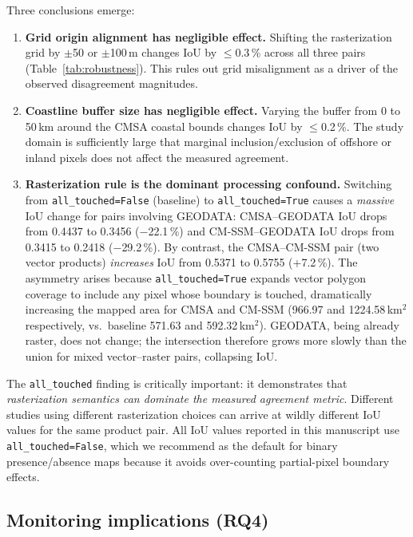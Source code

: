 \documentclass[11pt]{article}
\begin{document}
Three conclusions emerge:

\begin{enumerate}[nosep]
\item \textbf{Grid origin alignment has negligible effect.} Shifting the
  rasterization grid by $\pm$50 or $\pm$100\,m changes IoU by $\leq$0.3\,\%
  across all three pairs (Table~\ref{tab:robustness}). This rules out grid
  misalignment as a driver of the observed disagreement magnitudes.
\item \textbf{Coastline buffer size has negligible effect.} Varying the buffer
  from 0 to 50\,km around the CMSA coastal bounds changes IoU by $\leq$0.2\,\%.
  The study domain is sufficiently large that marginal inclusion/exclusion of
  offshore or inland pixels does not affect the measured agreement.
\item \textbf{Rasterization rule is the dominant processing confound.} Switching
  from \texttt{all\_touched=False} (baseline) to \texttt{all\_touched=True}
  causes a \emph{massive} IoU change for pairs involving GEODATA:
  CMSA--GEODATA IoU drops from 0.4437 to 0.3456 ($-$22.1\,\%) and
  CM-SSM--GEODATA IoU drops from 0.3415 to 0.2418 ($-$29.2\,\%). By contrast,
  the CMSA--CM-SSM pair (two vector products) \emph{increases} IoU from 0.5371
  to 0.5755 (+7.2\,\%). The asymmetry arises because \texttt{all\_touched=True}
  expands vector polygon coverage to include any pixel whose boundary is
  touched, dramatically increasing the mapped area for CMSA and CM-SSM
  (966.97 and 1224.58\,km$^2$ respectively, vs.\ baseline 571.63 and
  592.32\,km$^2$). GEODATA, being already raster, does not change; the
  intersection therefore grows more slowly than the union for mixed
  vector--raster pairs, collapsing IoU.
\end{enumerate}

The \texttt{all\_touched} finding is critically important: it demonstrates that
\emph{rasterization semantics can dominate the measured agreement metric}.
Different studies using different rasterization choices can arrive at wildly
different IoU values for the same product pair. All IoU values reported in
this manuscript use \texttt{all\_touched=False}, which we recommend as the
default for binary presence/absence maps because it avoids over-counting
partial-pixel boundary effects.

\subsection{Monitoring implications (RQ4)}
\label{sec:rq4}
\end{document}
